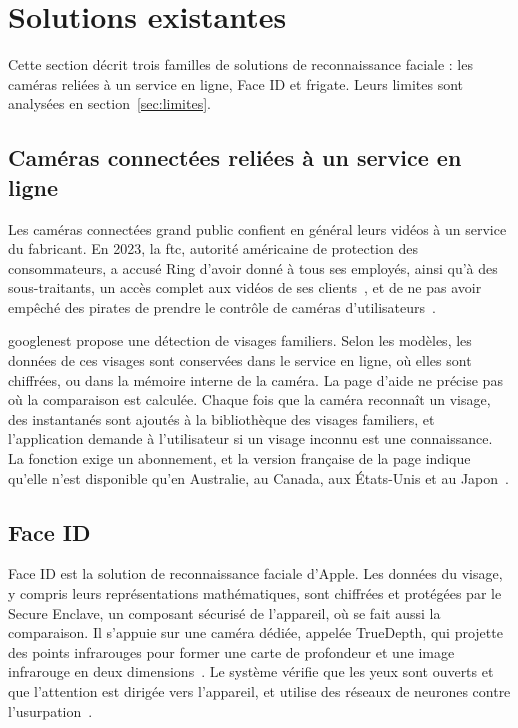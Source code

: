 \section{Solutions existantes}

\begin{maj}
Cette section décrit trois familles de solutions de reconnaissance faciale : les caméras reliées à un service en ligne, Face ID et \gls{frigate}. Leurs limites sont analysées en section~\ref{sec:limites}.
\end{maj}

\subsection{Caméras connectées reliées à un service en ligne}

Les caméras connectées grand public confient en général leurs vidéos à un service du fabricant. En 2023, la \gls{ftc}, autorité américaine de protection des consommateurs, a accusé Ring d'avoir donné à tous ses employés, ainsi qu'à des sous-traitants, un accès complet aux vidéos de ses clients~\cite{ftc2023ring}, et de ne pas avoir empêché des pirates de prendre le contrôle de caméras d'utilisateurs~\cite{ftc2023ringpr}.

\gls{googlenest} propose une détection de visages familiers. Selon les modèles, les données de ces visages sont conservées dans le service en ligne, où elles sont chiffrées, ou dans la mémoire interne de la caméra. La page d'aide ne précise pas où la comparaison est calculée. Chaque fois que la caméra reconnaît un visage, des instantanés sont ajoutés à la bibliothèque des visages familiers, et l'application demande à l'utilisateur si un visage inconnu est une connaissance. La fonction exige un abonnement, et la version française de la page indique qu'elle n'est disponible qu'en Australie, au Canada, aux États-Unis et au Japon~\cite{google2026familiarface}.

\subsection{Face ID}

Face ID est la solution de reconnaissance faciale d'Apple. Les données du visage, y compris leurs représentations mathématiques, sont chiffrées et protégées par le Secure Enclave, un composant sécurisé de l'appareil, où se fait aussi la comparaison. Il s'appuie sur une caméra dédiée, appelée TrueDepth, qui projette des points infrarouges pour former une carte de profondeur et une image infrarouge en deux dimensions~\cite{apple2026faceid,apple_biometric_security}. Le système vérifie que les yeux sont ouverts et que l'attention est dirigée vers l'appareil, et utilise des réseaux de neurones contre l'usurpation~\cite{apple2026faceid}.

